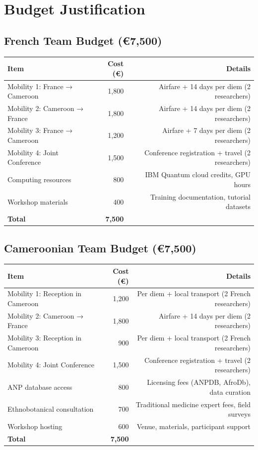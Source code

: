\documentclass[11pt,a4paper]{article}
\begin{document}
\section{Budget Justification}

\subsection{French Team Budget (€7,500)}

\begin{table}[h]
\centering
\begin{tabular}{lrr}
\toprule
\textbf{Item} & \textbf{Cost (€)} & \textbf{Details} \\
\midrule
Mobility 1: France → Cameroon & 1,800 & Airfare + 14 days per diem (2 researchers) \\
Mobility 2: Cameroon → France & 1,800 & Airfare + 14 days per diem (2 researchers) \\
Mobility 3: France → Cameroon & 1,200 & Airfare + 7 days per diem (2 researchers) \\
Mobility 4: Joint Conference & 1,500 & Conference registration + travel (2 researchers) \\
Computing resources & 800 & IBM Quantum cloud credits, GPU hours \\
Workshop materials & 400 & Training documentation, tutorial datasets \\
\midrule
\textbf{Total} & \textbf{7,500} & \\
\bottomrule
\end{tabular}
\end{table}

\subsection{Cameroonian Team Budget (€7,500)}

\begin{table}[h]
\centering
\begin{tabular}{lrr}
\toprule
\textbf{Item} & \textbf{Cost (€)} & \textbf{Details} \\
\midrule
Mobility 1: Reception in Cameroon & 1,200 & Per diem + local transport (2 French researchers) \\
Mobility 2: Cameroon → France & 1,800 & Airfare + 14 days per diem (2 researchers) \\
Mobility 3: Reception in Cameroon & 900 & Per diem + local transport (2 French researchers) \\
Mobility 4: Joint Conference & 1,500 & Conference registration + travel (2 researchers) \\
ANP database access & 800 & Licensing fees (ANPDB, AfroDb), data curation \\
Ethnobotanical consultation & 700 & Traditional medicine expert fees, field surveys \\
Workshop hosting & 600 & Venue, materials, participant support \\
\midrule
\textbf{Total} & \textbf{7,500} & \\
\bottomrule
\end{tabular}
\end{table}
\end{document}
